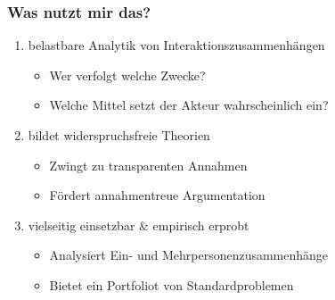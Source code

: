 \documentclass{beamer}
\begin{document}
\begin{frame}
  \frametitle{Was nutzt mir das?}
  \begin{enumerate}
    \item belastbare Analytik von Interaktionszusammenhängen
    \begin{itemize}
      \item Wer verfolgt welche Zwecke?
      \item Welche Mittel setzt der Akteur wahrscheinlich ein?
    \end{itemize}
    \item bildet widerspruchsfreie Theorien
    \begin{itemize}
      \item Zwingt zu transparenten Annahmen
      \item Fördert annahmentreue Argumentation
    \end{itemize}
    \item vielseitig einsetzbar \& empirisch erprobt
    \begin{itemize}
      \item Analysiert Ein- und Mehrpersonenzusammenhänge
      \item Bietet ein Portfoliot von Standardproblemen
    \end{itemize}
  \end{enumerate}
\end{frame}
\end{document}

